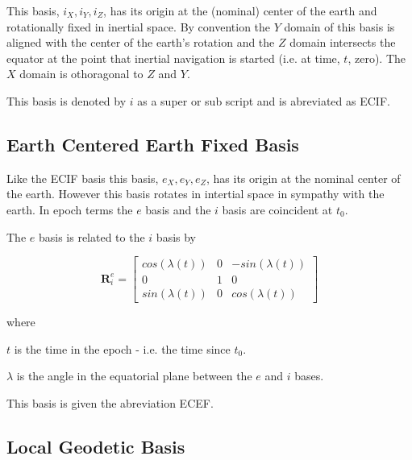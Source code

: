 \documentclass[a4paper]{report}
\numberwithin{equation}{chapter}
\newcommand{\mat}[1]{\boldsymbol{#1}}
\begin{document}
\bigskip

This basis, $i_X, i_Y, i_Z$, has its origin at the (nominal) center of the earth and rotationally fixed in inertial space. By convention the $Y$ domain of this basis is aligned with the center of the earth's rotation and the $Z$ domain intersects the equator at the point that inertial navigation is started (i.e. at time, $t$, zero). The $X$ domain is othoragonal to $Z$ and $Y$.

This basis is denoted by $i$ as a super or sub script and is abreviated as ECIF.

\bigskip

\subsection[Earth Centered Earth Fixed Basis]{Earth Centered Earth Fixed Basis}

\bigskip

Like the ECIF basis this basis, $e_X, e_Y, e_Z$, has its origin at the nominal center of the earth. However this basis rotates in intertial space in sympathy with the earth. In epoch terms the $e$ basis and the $i$ basis are coincident at $t_0$.

\bigskip

The $e$ basis is related to the $i$ basis by

\bigskip

\begin{equation}
\mat{R}^e_i =
\begin{bmatrix}
cos \left( \lambda \left( t \right) \right) & 0 & -sin \left( \lambda \left( t \right) \right) \\
0 & 1 & 0 \\
sin \left( \lambda \left( t \right) \right) & 0 & cos \left( \lambda \left( t \right) \right)

\end{bmatrix}
\end{equation}

\bigskip

where

$t$ is the time in the epoch - i.e. the time since $t_0$.

$\lambda$ is the angle in the equatorial plane between the $e$ and $i$ bases.

\bigskip

This basis is given the abreviation ECEF.

\subsection[Local Geodetic Basis]{Local Geodetic Basis}
\end{document}

